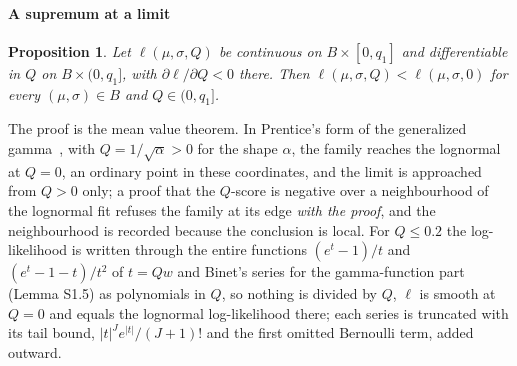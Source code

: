 \documentclass[preprint,11pt,a4paper]{elsarticle}
\newtheorem{proposition}{Proposition}
\theoremstyle{definition}
\begin{document}
\paragraph{A supremum at a limit}
\begin{proposition}\label{prop:limit}
Let $\ell(\mu,\sigma,Q)$ be continuous on $B\times[0,q_1]$ and differentiable in $Q$ on $B\times(0,q_1]$, with $\partial\ell/\partial Q<0$ there. Then $\ell(\mu,\sigma,Q)<\ell(\mu,\sigma,0)$ for every $(\mu,\sigma)\in B$ and $Q\in(0,q_1]$.
\end{proposition}
The proof is the mean value theorem. In Prentice's form of the generalized gamma~\citep{Prentice74}, with $Q=1/\sqrt{\alpha}>0$ for the shape $\alpha$, the family reaches the lognormal at $Q=0$, an ordinary point in these coordinates, and the limit is approached from $Q>0$ only; a proof that the $Q$-score is negative over a neighbourhood of the lognormal fit refuses the family at its edge \emph{with the proof}, and the neighbourhood is recorded because the conclusion is local. For $Q\le0.2$ the log-likelihood is written through the entire functions $(e^{t}-1)/t$ and $(e^{t}-1-t)/t^2$ of $t=Qw$ and Binet's series for the gamma-function part (Lemma S1.5) as polynomials in $Q$, so nothing is divided by $Q$, $\ell$ is smooth at $Q=0$ and equals the lognormal log-likelihood there; each series is truncated with its tail bound, $|t|^Je^{|t|}/(J+1)!$ and the first omitted Bernoulli term, added outward.
\end{document}
